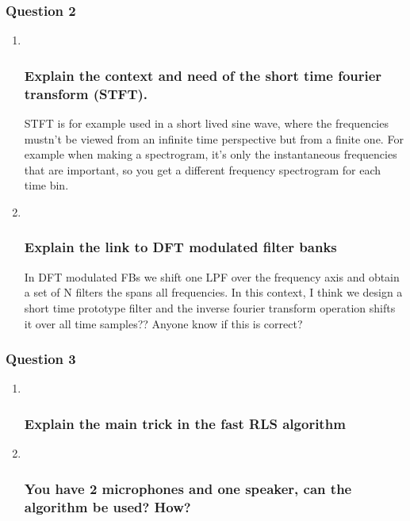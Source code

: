 \documentclass[
  a4paper,
  ,captions=tableheading
]{scrartcl}
\begin{document}
\subsubsection{Question 2}\label{question-2-5}

\begin{enumerate}
\def\labelenumi{\arabic{enumi}.}
\item ~
  \subsubsection{Explain the context and need of the short time fourier
  transform
  (STFT).}\label{explain-the-context-and-need-of-the-short-time-fourier-transform-stft.}

  STFT is for example used in a short lived sine wave, where the
  frequencies mustn't be viewed from an infinite time perspective but
  from a finite one. For example when making a spectrogram, it's only
  the instantaneous frequencies that are important, so you get a
  different frequency spectrogram for each time bin.
\item ~
  \subsubsection{Explain the link to DFT modulated filter
  banks}\label{explain-the-link-to-dft-modulated-filter-banks}

  In DFT modulated FBs we shift one LPF over the frequency axis and
  obtain a set of N filters the spans all frequencies. In this context,
  I think we design a short time prototype filter and the inverse
  fourier transform operation shifts it over all time samples?? Anyone
  know if this is correct?
\end{enumerate}

\subsubsection{Question 3}\label{question-3-6}

\begin{enumerate}
\def\labelenumi{\arabic{enumi}.}
\item ~
  \subsubsection{Explain the main trick in the fast RLS
  algorithm}\label{explain-the-main-trick-in-the-fast-rls-algorithm}
\item ~
  \subsubsection{You have 2 microphones and one speaker, can the
  algorithm be used?
  How?}\label{you-have-2-microphones-and-one-speaker-can-the-algorithm-be-used-how}
\end{enumerate}
\end{document}
